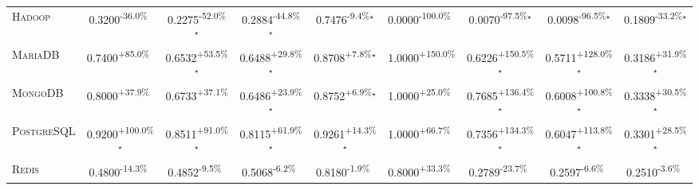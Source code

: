 \begin{table}[htbp]
\begin{tabular}{l|cccc|cccc}
\textsc{Hadoop} & \cellcolor{red!30}0.3200\textsuperscript{-36.0\%}$^{\,\,\,}$ & \cellcolor{red!30}0.2275\textsuperscript{-52.0\%}$^\star$ & \cellcolor{red!30}0.2884\textsuperscript{-44.8\%}$^\star$ & \cellcolor{red!30}0.7476\textsuperscript{-9.4\%}$^\star$ & \cellcolor{red!30}0.0000\textsuperscript{-100.0\%}$^{\,\,\,}$ & \cellcolor{red!30}0.0070\textsuperscript{-97.5\%}$^\star$ & \cellcolor{red!30}0.0098\textsuperscript{-96.5\%}$^\star$ & \cellcolor{red!30}0.1809\textsuperscript{-33.2\%}$^\star$ \\
\textsc{MariaDB} & \cellcolor{green!30}0.7400\textsuperscript{+85.0\%}$^{\,\,\,}$ & \cellcolor{green!30}0.6532\textsuperscript{+53.5\%}$^\star$ & \cellcolor{green!30}0.6488\textsuperscript{+29.8\%}$^\star$ & \cellcolor{green!30}0.8708\textsuperscript{+7.8\%}$^\star$ & \cellcolor{green!30}1.0000\textsuperscript{+150.0\%}$^{\,\,\,}$ & \cellcolor{green!30}0.6226\textsuperscript{+150.5\%}$^\star$ & \cellcolor{green!30}0.5711\textsuperscript{+128.0\%}$^\star$ & \cellcolor{green!30}0.3186\textsuperscript{+31.9\%}$^\star$ \\
\textsc{MongoDB} & \cellcolor{green!30}0.8000\textsuperscript{+37.9\%}$^{\,\,\,}$ & \cellcolor{green!30}0.6733\textsuperscript{+37.1\%}$^{\,\,\,}$ & \cellcolor{green!30}0.6486\textsuperscript{+23.9\%}$^\star$ & \cellcolor{green!30}0.8752\textsuperscript{+6.9\%}$^\star$ & \cellcolor{green!30}1.0000\textsuperscript{+25.0\%}$^{\,\,\,}$ & \cellcolor{green!30}0.7685\textsuperscript{+136.4\%}$^\star$ & \cellcolor{green!30}0.6008\textsuperscript{+100.8\%}$^\star$ & \cellcolor{green!30}0.3338\textsuperscript{+30.5\%}$^\star$ \\
\textsc{PostgreSQL} & \cellcolor{green!30}0.9200\textsuperscript{+100.0\%}$^\star$ & \cellcolor{green!30}0.8511\textsuperscript{+91.0\%}$^\star$ & \cellcolor{green!30}0.8115\textsuperscript{+61.9\%}$^\star$ & \cellcolor{green!30}0.9261\textsuperscript{+14.3\%}$^\star$ & \cellcolor{green!30}1.0000\textsuperscript{+66.7\%}$^{\,\,\,}$ & \cellcolor{green!30}0.7356\textsuperscript{+134.3\%}$^\star$ & \cellcolor{green!30}0.6047\textsuperscript{+113.8\%}$^\star$ & \cellcolor{green!30}0.3301\textsuperscript{+28.5\%}$^\star$ \\
\textsc{Redis} & \cellcolor{red!30}0.4800\textsuperscript{-14.3\%}$^{\,\,\,}$ & \cellcolor{red!30}0.4852\textsuperscript{-9.5\%}$^{\,\,\,}$ & \cellcolor{red!30}0.5068\textsuperscript{-6.2\%}$^{\,\,\,}$ & \cellcolor{red!30}0.8180\textsuperscript{-1.9\%}$^{\,\,\,}$ & \cellcolor{green!30}0.8000\textsuperscript{+33.3\%}$^{\,\,\,}$ & \cellcolor{red!30}0.2789\textsuperscript{-23.7\%}$^{\,\,\,}$ & \cellcolor{red!30}0.2597\textsuperscript{-6.6\%}$^{\,\,\,}$ & \cellcolor{red!30}0.2510\textsuperscript{-3.6\%}$^{\,\,\,}$ \\

\end{tabular}
\end{table}
